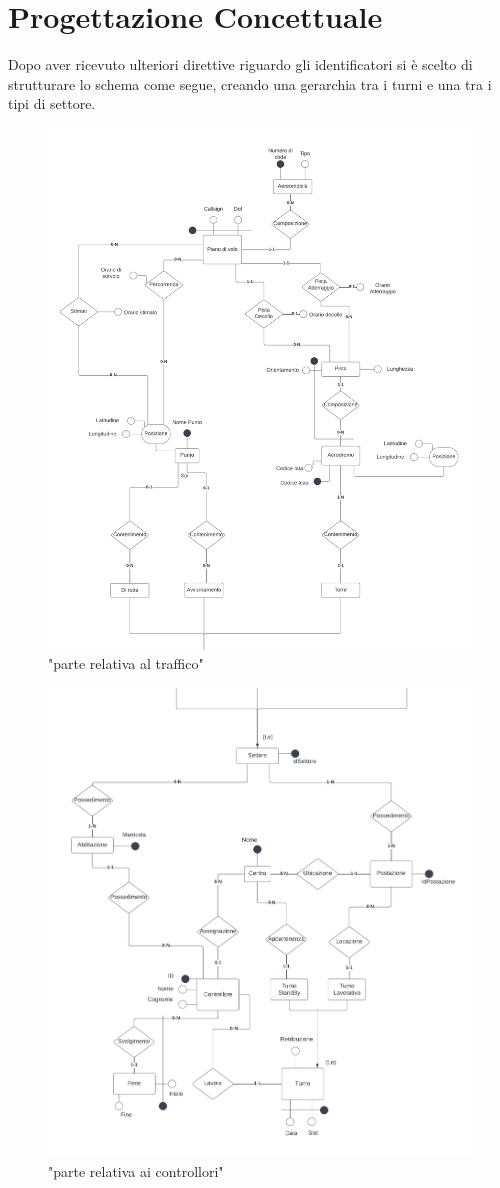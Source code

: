 \chapter{Progettazione Concettuale}
Dopo aver ricevuto ulteriori direttive riguardo gli identificatori si è scelto di strutturare lo schema come segue, creando una gerarchia tra i turni e una tra i tipi di settore.
\begin{figure}[H]
  \centering
  \includegraphics[width=1\textwidth]{figures/Top.pdf}
  \caption{"parte relativa al traffico"}
\end{figure}
\begin{figure}[H]
  \centering
  \includegraphics[width=1\textwidth]{figures/Bottom.pdf}
  \caption{"parte relativa ai controllori"}
\end{figure}